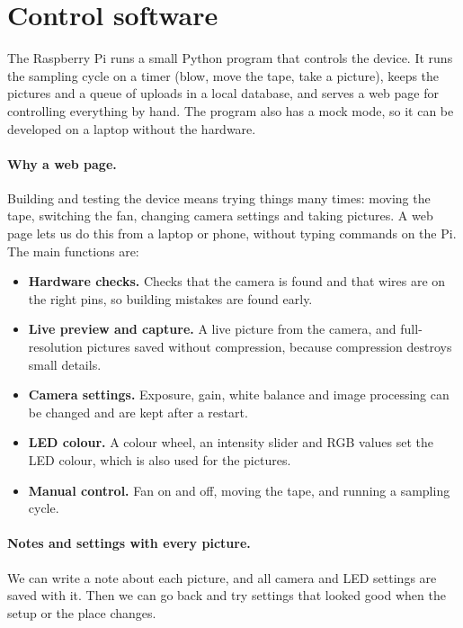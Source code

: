 \section{Control software}\label{sec:control-software}

The Raspberry Pi runs a small Python program that controls the device. It runs the sampling
cycle on a timer (blow, move the tape, take a picture), keeps the pictures and a queue of
uploads in a local database, and serves a web page for controlling everything by hand.
The program also has a mock mode, so it can be developed on a laptop without the hardware.

\paragraph{Why a web page.}
Building and testing the device means trying things many times: moving the tape, switching
the fan, changing camera settings and taking pictures. A web page lets us do this from a laptop
or phone, without typing commands on the Pi. The main functions are:

\begin{itemize}
  \item \textbf{Hardware checks.} Checks that the camera is found and that wires are on the right
  pins, so building mistakes are found early.
  \item \textbf{Live preview and capture.} A live picture from the camera, and full-resolution
  pictures saved without compression, because compression destroys small details.
  \item \textbf{Camera settings.} Exposure, gain, white balance and image processing can be changed
  and are kept after a restart.
  \item \textbf{LED colour.} A colour wheel, an intensity slider and RGB values set the LED colour,
  which is also used for the pictures.
  \item \textbf{Manual control.} Fan on and off, moving the tape, and running a sampling cycle.
\end{itemize}

\paragraph{Notes and settings with every picture.}
We can write a note about each picture, and all camera and LED settings are saved with it.
Then we can go back and try settings that looked good when the setup or the place changes.

